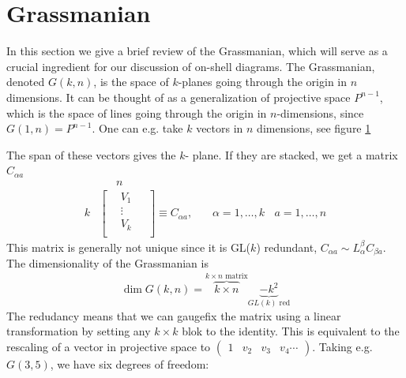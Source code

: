 \documentclass[letter,11pt]{article}
\begin{document}
\section{Grassmanian\label{sec:grassmanian}}
In this section we give a brief review of the Grassmanian, which will serve as a crucial ingredient for our discussion of on-shell diagrams.
The Grassmanian, denoted $G(k,n)$, is the space of $k$-planes going through the origin in $n$ dimensions. It can be thought of as a generalization of projective space $P^{n-1}$, which is the space of lines going through the origin in $n$-dimensions, since $G(1,n)=P^{n-1}$. One can e.g. take $k$ vectors in $n$ dimensions, see figure \ref{fig:1}
\begin{figure}[H]
	\centering
{}
\label{fig:1}
\end{figure}
The span of these vectors gives the $k$- plane. If they are stacked, we get a matrix $C_{\alpha a}$
\begin{equation}
\begin{aligned}
	&~~~~~~~n\\
	k&
\begin{bmatrix}
	~~~~V_1~~~~~\\
	~~~~\vdots ~~~~~\\
	~~~~V_k~~~~~\\
\end{bmatrix}\equiv C_{\alpha a},~~~~~~~~\alpha=1,\dots,k~~~~a=1,\dots,n
\end{aligned}
\end{equation}
This matrix is generally not unique since it is GL($k$) redundant, $
C_{\alpha a}\sim L^{\beta}_\alpha C_{\beta a}$.
The dimensionality of the Grassmanian is 
\begin{equation}
\dim G(k,n)=\overbrace{k\times n}^{k\times n \text{ matrix}}\underbrace{-k^2}_{GL(k) \text{ red}}
\end{equation}
The redudancy means that we can gaugefix the matrix using a linear transformation by setting any $k\times k$ blok to the identity. This is equivalent to the rescaling of a vector in projective space to $\begin{pmatrix}
1 & v_2 & v_3 & v_4 \cdots
\end{pmatrix}$. Taking e.g. $G(3,5)$, we have six degrees of freedom:
\end{document}

